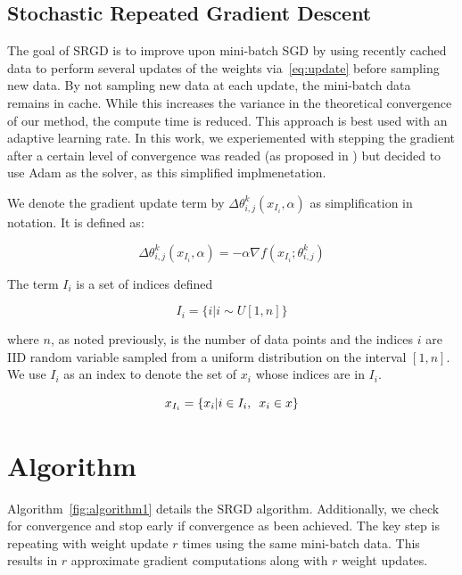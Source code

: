 \documentclass[,conference,compsoc]{IEEEtran}
\begin{document}
\subsection{Stochastic Repeated Gradient Descent}
The goal of SRGD is to improve upon mini-batch SGD by using recently cached data to perform
several updates of the weights via~\ref{eq:update} before sampling new data. By
not sampling new data at each update, the mini-batch data remains in cache.
While this increases the variance in the theoretical convergence of our method,
the compute time is reduced. This approach is best used with an adaptive
learning rate. In this work, we experiemented with stepping the gradient after a
certain level of convergence was readed (as proposed in \cite{bib:xu-assgd}) but decided to
use Adam as the solver, as this simplified implmenetation.

We denote the gradient update term by $\Delta\theta_{i,j}^{k}(x_{I_i}, \alpha)$ as
simplification in notation. It is defined as:

\begin{equation*}
    \Delta\theta_{i,j}^{k}(x_{I_i}, \alpha) = -\alpha \nabla f(x_{I_i}; \theta_{i,j}^k)
\end{equation*}

The term $I_i$ is a set of indices defined

\begin{equation*}
    I_i = \{i | i \sim U[1,n]\}
\end{equation*}

where $n$, as noted previously, is the number of data points and the indices $i$
are IID random variable sampled from a uniform distribution on the interval
$[1,n]$. We use $I_i$ as an index to denote the set of $x_i$ whose indices are
in $I_i$.

\begin{equation*}
    x_{I_i} = \{ x_i | i \in I_i, \hspace{.5em}x_i \in x \}
\end{equation*}

\section{Algorithm}
Algorithm~\ref{fig:algorithm1}  details the SRGD algorithm. Additionally, we
check for convergence and stop early if convergence as been achieved. The key
step is repeating with weight update $r$ times using the same mini-batch data.
This results in $r$ approximate gradient computations along with $r$ weight
updates. 
\end{document}

